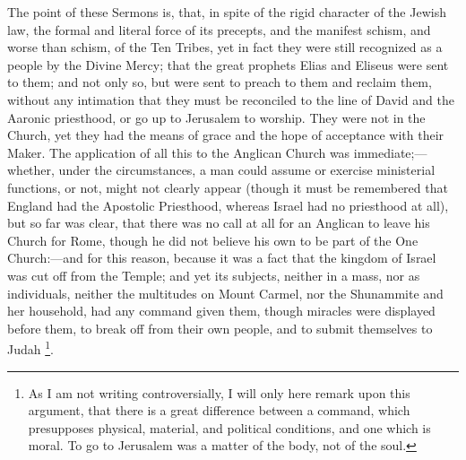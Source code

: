 The point of these Sermons is, that, in spite of the rigid character
of the Jewish law, the formal and literal force of its precepts, and the
manifest schism, and worse than schism, of the Ten Tribes, yet in fact
they were still recognized as a people by the Divine Mercy; that the
great prophets Elias and Eliseus were sent to them; and not only so, but
were sent to preach to them and reclaim them, without any
intimation that they must be reconciled to the line of David and the
Aaronic priesthood, or go up to Jerusalem to worship. They were not in
the Church, yet they had the means of grace and the hope of acceptance
with their Maker. The application of all this to the Anglican Church was
immediate;—whether, under the circumstances, a man could
assume or exercise ministerial functions, or
not, might not clearly appear (though it must be remembered that England
had the Apostolic Priesthood, whereas Israel had no priesthood at all), but so far was clear, that there was no call at all for an
Anglican to leave his Church for Rome, though he did not believe his own
to be part of the One Church:—and for this reason, because it was a
fact that the kingdom of Israel was cut off from the Temple; and yet its
subjects, neither in a mass, nor as individuals, neither the multitudes
on Mount Carmel, nor the Shunammite and her household, had any command
given them, though miracles were displayed before them, to break
off from their own people, and to submit themselves to Judah \footnote{As I am not writing controversially, I will only
here remark upon this argument, that there is a great difference between
a command, which presupposes physical, material, and
political conditions, and one which is moral. To go to Jerusalem was
a matter of the body, not of the soul.}.

